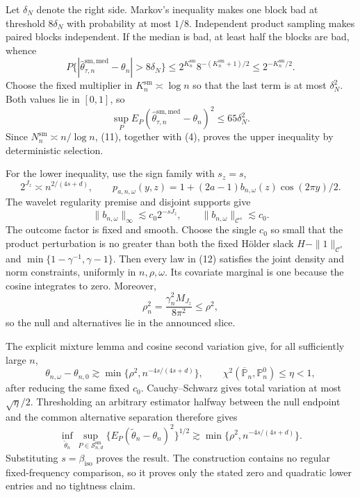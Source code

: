 Let \(\delta_N\) denote the right side.  Markov's inequality makes one block bad at threshold \(8\delta_N\) with probability at most \(1/8\).  Independent product sampling makes paired blocks independent.  If the median is bad, at least half the blocks are bad, whence
\[
P\{|\widehat\theta^{\mathrm{sm,med}}_{\tau,n}-\theta_n|>8\delta_N\}
\le2^{K_n^{\mathrm{sm}}}8^{-(K_n^{\mathrm{sm}}+1)/2}
\le2^{-K_n^{\mathrm{sm}}/2}. \tag{10}
\]
Choose the fixed multiplier in \(K_n^{\mathrm{sm}}\asymp\log n\) so that the last term is at most \(\delta_N^2\).  Both values lie in \([0,1]\), so
\[
\sup_PE_P(\widehat\theta^{\mathrm{sm,med}}_{\tau,n}-\theta_n)^2
\le65\delta_N^2. \tag{11}
\]
Since \(N_n^{\mathrm{sm}}\asymp n/\log n\), (11), together with (4), proves the upper inequality by deterministic selection.

For the lower inequality, use the sign family with \(s_z=s\),
\[
2^{J_z}\asymp n^{2/(4s+d)},
\qquad
p_{a,n,\omega}(y,z)=1+(2a-1)b_{n,\omega}(z)\cos(2\pi y)/2. \tag{12}
\]
The wavelet regularity premise and disjoint supports give
\[
\|b_{n,\omega}\|_\infty\lesssim c_0 2^{-sJ_z},
\qquad
\|b_{n,\omega}\|_{\mathcal C^s}\lesssim c_0. \tag{13}
\]
The outcome factor is fixed and smooth.  Choose the single \(c_0\) so small that the product perturbation is no greater than both the fixed H\"older slack \(H-\|1\|_{\mathcal C^s}\) and \(\min\{1-\gamma^{-1},\gamma-1\}\).  Then every law in (12) satisfies the joint density and norm constraints, uniformly in \(n,\rho,\omega\).  Its covariate marginal is one because the cosine integrates to zero.  Moreover,
\[
\rho_n^2=\frac{\gamma_n^2M_{J_z}}{8\pi^2}\le\rho^2, \tag{14}
\]
so the null and alternatives lie in the announced slice.

The explicit mixture lemma and cosine second variation give, for all sufficiently large \(n\),
\[
\theta_{n,\omega}-\theta_{n,0}
\gtrsim\min\{\rho^2,n^{-4s/(4s+d)}\},
\qquad
\chi^2(\overline{\mathbb P}_n,\mathbb P_n^0)\le\eta<1, \tag{15}
\]
after reducing the same fixed \(c_0\).  Cauchy--Schwarz gives total variation at most \(\sqrt\eta/2\).  Thresholding an arbitrary estimator halfway between the null endpoint and the common alternative separation therefore gives
\[
\inf_{\widetilde\theta_n}\sup_{P\in\mathcal S^{\mathrm{sm}}_{n,d}}
\{E_P(\widetilde\theta_n-\theta_n)^2\}^{1/2}
\gtrsim\min\{\rho^2,n^{-4s/(4s+d)}\}. \tag{16}
\]
Substituting \(s=\beta_{\mathrm{iso}}\) proves the result.  The construction contains no regular fixed-frequency comparison, so it proves only the stated zero and quadratic lower entries and no tightness claim.